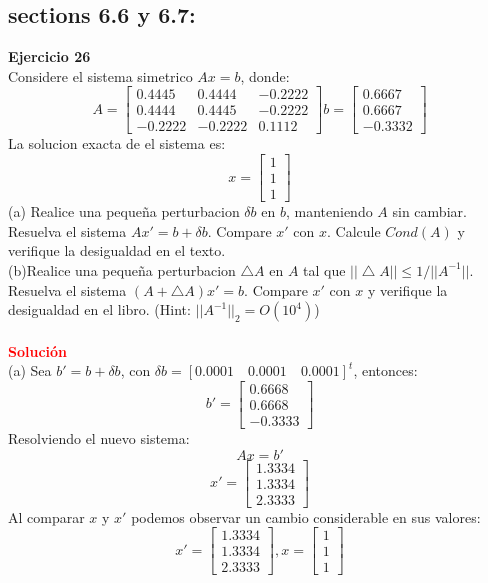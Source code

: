 \documentclass[12pt]{article}
\begin{document}
\subsection{sections 6.6 y 6.7:}
 \noindent \textbf{Ejercicio 26}\\
 
Considere el sistema simetrico $Ax=b$, donde:
$$A=\begin{bmatrix}
    0.4445&0.4444&-0.2222\\
    0.4444&0.4445&-0.2222\\
    -0.2222&-0.2222&0.1112
\end{bmatrix}
b=\begin{bmatrix}
    0.6667\\
    0.6667\\
    -0.3332
\end{bmatrix}
$$
La solucion exacta de el sistema es:
$$x=\begin{bmatrix}
    1\\
    1\\
    1
\end{bmatrix}
$$
(a) Realice una pequeña perturbacion $\delta b$ en $b$, manteniendo $A$ sin cambiar. Resuelva el sistema $Ax'=b+\delta b$. Compare $x'$ con $x$. Calcule $Cond(A)$ y verifique la desigualdad en el texto.\\
(b)Realice una pequeña perturbacion $\bigtriangleup A$ en $A$ tal que $||\bigtriangleup A||\leq 1/||A^{-1}||$. Resuelva el sistema  $(A+\bigtriangleup A)x'=b$. Compare $x'$ con $x$ y verifique la desigualdad en el libro. (Hint: $||A^{-1}||_2=O(10^4)$)
\\\\
\noindent \textcolor{red}{\bf Soluci\'on}\\
(a) Sea $b'=b+\delta b$, con $\delta b=[0.0001 \quad 0.0001 \quad 0.0001]^t$, entonces:
$$b'=\begin{bmatrix}
    0.6668\\
    0.6668\\
    -0.3333
\end{bmatrix}
$$
Resolviendo el nuevo sistema:
$$Ax=b'$$
$$x'=\begin{bmatrix}
    1.3334\\
    1.3334\\
    2.3333
\end{bmatrix}
$$
Al comparar $x$ y $x'$ podemos observar un cambio considerable en sus valores:
$$x'=\begin{bmatrix}
    1.3334\\
    1.3334\\
    2.3333
\end{bmatrix}
, x=\begin{bmatrix}
    1\\
    1\\
    1
\end{bmatrix}
$$
\end{document}
